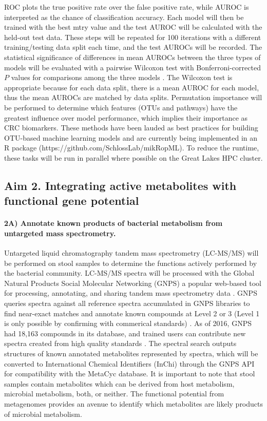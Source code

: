 \documentclass[11pt]{article}
\begin{document}
ROC plots the true positive rate over the false positive rate, while AUROC is interpreted as the chance of classification accuracy.
Each model will then be trained with the best mtry value and the test AUROC will be calculated with the held-out test data.
These steps will be repeated for 100 iterations with a different training/testing data split each time, and the test AUROCs will be recorded.
The statistical significance of differences in mean AUROCs between the three types of models will be evaluated with a pairwise Wilcoxon test with Bonferroni-corrected $P$ values for comparisons among the three models \cite{hannigan_diagnostic_2018}.
The Wilcoxon test is appropriate because for each data split, there is a mean AUROC for each model, thus the mean AUROCs are matched by data splits.
Permutation importance will be performed to determine which features (OTUs and pathways) have the greatest influence over model performance, which implies their importance as CRC biomarkers.
These methods have been lauded as best practices for building OTU-based machine learning models \cite{topcuoglu_framework_2020} and are currently being implemented in an R package (https://github.com/SchlossLab/mikRopML).
To reduce the runtime, these tasks will be run in parallel where possible on the Great Lakes HPC cluster.

\subsection*{Aim 2. Integrating active metabolites with functional gene potential}

\paragraph{2A) Annotate known products of bacterial metabolism from untargeted mass spectrometry.}

Untargeted liquid chromatography tandem mass spectrometry (LC-MS/MS) will be performed on stool samples to determine the functions actively performed by the bacterial community.
LC-MS/MS spectra will be processed with the Global Natural Products Social Molecular Networking (GNPS) a popular web-based tool for processing, annotating, and sharing tandem mass spectrometry data \cite{wang_sharing_2016}.
GNPS queries spectra against all reference spectra accumulated in GNPS libraries to find near-exact matches and annotate known compounds at Level 2 or 3 (Level 1 is only possible by confirming with commerical standards) \cite{aron_reproducible_2020}.
As of 2016, GNPS had 18,163 compounds in its database, and trained users can contribute new spectra created from high quality standards \cite{vargas_protocol_2019}.
The spectral search outputs structures of known annotated metabolites represented by spectra, which will be converted to International Chemical Identifiers (InChi) through the GNPS API for compatibility with the MetaCyc database.
It is important to note that stool samples contain metabolites which can be derived from host metabolism, microbial metabolism, both, or neither.
The functional potential from metagenomes provides an avenue to identify which metabolites are likely products of microbial metabolism.
\end{document}
